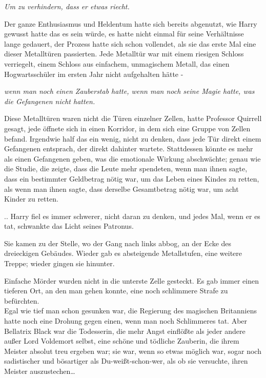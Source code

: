 {\emph{Um zu verhindern, dass er etwas riecht.}

Der ganze Enthusiasmus und Heldentum hatte sich bereits abgenutzt, wie Harry gewusst hatte das es sein würde, es hatte nicht einmal für seine Verhältnisse lange gedauert, der Prozess hatte sich schon vollendet, als sie das erste Mal eine dieser Metalltüren passierten. Jede Metalltür war mit einem riesigen Schloss verriegelt, einem Schloss aus einfachem, unmagischem Metall, das einen Hogwartsschüler im ersten Jahr nicht aufgehalten hätte -

\emph{wenn man noch einen Zauberstab hatte, wenn man noch seine Magie hatte, was die Gefangenen nicht hatten.}

Diese Metalltüren waren nicht die Türen einzelner Zellen, hatte Professor Quirrell gesagt, jede öffnete sich in einen Korridor, in dem sich eine Gruppe von Zellen befand. Irgendwie half das ein wenig, nicht zu denken, dass jede Tür direkt einem Gefangenen entsprach, der direkt dahinter wartete. Stattdessen könnte es mehr als einen Gefangenen geben, was die emotionale Wirkung abschwächte; genau wie die Studie, die zeigte, dass die Leute mehr spendeten, wenn man ihnen sagte, dass ein bestimmter Geldbetrag nötig war, um das Leben eines Kindes zu retten, als wenn man ihnen sagte, dass derselbe Gesamtbetrag nötig war, um acht Kinder zu retten.

.. Harry fiel es immer schwerer, nicht daran zu denken, und jedes Mal, wenn er es tat, schwankte das Licht seines Patronus.

Sie kamen zu der Stelle, wo der Gang nach links abbog, an der Ecke des dreieckigen Gebäudes. Wieder gab es absteigende Metallstufen, eine weitere Treppe; wieder gingen sie hinunter.

Einfache Mörder wurden nicht in die unterste Zelle gesteckt. Es gab immer einen tieferen Ort, an den man gehen konnte, eine noch schlimmere Strafe zu befürchten.\\ Egal wie tief man schon gesunken war, die Regierung des magischen Britanniens hatte noch eine Drohung gegen einen, wenn man noch Schlimmeres tat. Aber Bellatrix Black war die Todesserin, die mehr Angst einflößte als jeder andere außer Lord Voldemort selbst, eine schöne und tödliche Zauberin, die ihrem Meister absolut treu ergeben war; sie war, wenn so etwas möglich war, sogar noch sadistischer und bösartiger als Du-weißt-schon-wer, als ob sie versuchte, ihren Meister auszustechen…

}
